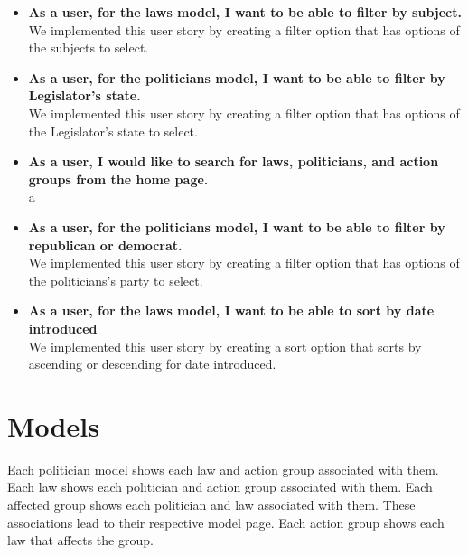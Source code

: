\documentclass[12pt]{article}
\begin{document}
\begin{itemize}
	\item\textbf{As a user, for the laws model, I want to be able to filter by subject.} \\
	We implemented this user story by creating a filter option that has options of the subjects to select.
	\\
	\item\textbf{As a user, for the politicians model, I want to be able to filter by Legislator's state.} \\
	We implemented this user story by creating a filter option that has options of the Legislator's state to select.
	\\
	
	\item\textbf{As a user, I would like to search for laws, politicians, and action groups from the home page.} \\
	a
	\\
	
	\item\textbf{As a user, for the politicians model, I want to be able to filter by republican or democrat.} \\
	We implemented this user story by creating a filter option that has options of the politicians's party to select.
	\\
	
	\item\textbf{As a user, for the laws model, I want to be able to sort by date introduced} \\
	We implemented this user story by creating a sort option that sorts by ascending or descending for date introduced.
	\\
\end{itemize}

\section{Models}
    Each politician model shows each law and action group associated with them. Each law shows each politician and action group associated with them. Each affected group shows each politician and law associated with them. These associations lead to their respective model page. Each action group shows each law that affects the group. \\
\end{document}
